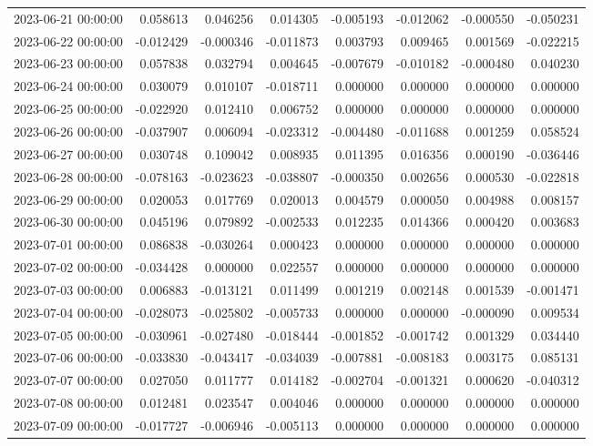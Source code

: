 \begin{tabular}{lrrrrrrr}
2023-06-21 00:00:00 & 0.058613 & 0.046256 & 0.014305 & -0.005193 & -0.012062 & -0.000550 & -0.050231 \\
2023-06-22 00:00:00 & -0.012429 & -0.000346 & -0.011873 & 0.003793 & 0.009465 & 0.001569 & -0.022215 \\
2023-06-23 00:00:00 & 0.057838 & 0.032794 & 0.004645 & -0.007679 & -0.010182 & -0.000480 & 0.040230 \\
2023-06-24 00:00:00 & 0.030079 & 0.010107 & -0.018711 & 0.000000 & 0.000000 & 0.000000 & 0.000000 \\
2023-06-25 00:00:00 & -0.022920 & 0.012410 & 0.006752 & 0.000000 & 0.000000 & 0.000000 & 0.000000 \\
2023-06-26 00:00:00 & -0.037907 & 0.006094 & -0.023312 & -0.004480 & -0.011688 & 0.001259 & 0.058524 \\
2023-06-27 00:00:00 & 0.030748 & 0.109042 & 0.008935 & 0.011395 & 0.016356 & 0.000190 & -0.036446 \\
2023-06-28 00:00:00 & -0.078163 & -0.023623 & -0.038807 & -0.000350 & 0.002656 & 0.000530 & -0.022818 \\
2023-06-29 00:00:00 & 0.020053 & 0.017769 & 0.020013 & 0.004579 & 0.000050 & 0.004988 & 0.008157 \\
2023-06-30 00:00:00 & 0.045196 & 0.079892 & -0.002533 & 0.012235 & 0.014366 & 0.000420 & 0.003683 \\
2023-07-01 00:00:00 & 0.086838 & -0.030264 & 0.000423 & 0.000000 & 0.000000 & 0.000000 & 0.000000 \\
2023-07-02 00:00:00 & -0.034428 & 0.000000 & 0.022557 & 0.000000 & 0.000000 & 0.000000 & 0.000000 \\
2023-07-03 00:00:00 & 0.006883 & -0.013121 & 0.011499 & 0.001219 & 0.002148 & 0.001539 & -0.001471 \\
2023-07-04 00:00:00 & -0.028073 & -0.025802 & -0.005733 & 0.000000 & 0.000000 & -0.000090 & 0.009534 \\
2023-07-05 00:00:00 & -0.030961 & -0.027480 & -0.018444 & -0.001852 & -0.001742 & 0.001329 & 0.034440 \\
2023-07-06 00:00:00 & -0.033830 & -0.043417 & -0.034039 & -0.007881 & -0.008183 & 0.003175 & 0.085131 \\
2023-07-07 00:00:00 & 0.027050 & 0.011777 & 0.014182 & -0.002704 & -0.001321 & 0.000620 & -0.040312 \\
2023-07-08 00:00:00 & 0.012481 & 0.023547 & 0.004046 & 0.000000 & 0.000000 & 0.000000 & 0.000000 \\
2023-07-09 00:00:00 & -0.017727 & -0.006946 & -0.005113 & 0.000000 & 0.000000 & 0.000000 & 0.000000 \\

\end{tabular}
